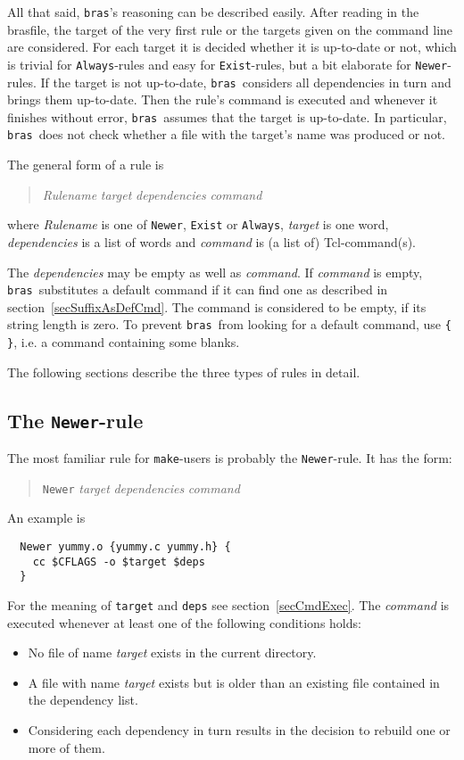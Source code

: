 \documentclass[12pt]{article}
\newcommand{\bras}{\texttt{bras}}
\newcommand{\make}{\texttt{make}}
\begin{document}
All that said, \bras's reasoning can be described easily.  After
reading in the brasfile, the target of the very first rule or the
targets given on the command line are considered. For each target it
is decided whether it is up-to-date or not, which is trivial for
\texttt{Always}-rules and easy for \texttt{Exist}-rules, but a bit
elaborate for \texttt{Newer}-rules. If the target is not up-to-date,
\bras\ considers all dependencies in turn and brings them
up-to-date. Then the rule's command is executed and whenever it
finishes without error, \bras\ assumes that the target is
up-to-date. In particular, \bras\ does not check whether a file with
the target's name was produced or not.

The general form of a rule is
\begin{quote}
\textit{Rulename} \textit{target} \textit{dependencies} \textit{command}
\end{quote}
where \textit{Rulename} is one of \texttt{Newer}, \texttt{Exist} or
\texttt{Always}, \textit{target} is one word, \textit{dependencies} is
a list of words and \textit{command} is (a list of) Tcl-command(s).

The \textit{dependencies} may be empty as well as \textit{command}. If
\textit{command} is empty, \bras\ substitutes a default command if it
can find one as described in section~\ref{secSuffixAsDefCmd}. The
command is considered to be empty, if its string length is zero. To
prevent \bras\ from looking for a default command, use \verb|{ }|,
i.e. a command containing some blanks.

The following sections describe the three types of rules in detail.

\subsection{The \texttt{Newer}-rule}
\label{secNewer}
The most familiar rule for \make-users is probably the
\texttt{Newer}-rule. It has the form:
\begin{quote}
  \texttt{Newer} \textit{target} \textit{dependencies} \textit{command}
\end{quote}
An example is
\begin{verbatim}
  Newer yummy.o {yummy.c yummy.h} {
    cc $CFLAGS -o $target $deps
  }
\end{verbatim}
For the meaning of \texttt{target} and \texttt{deps} see
section~\ref{secCmdExec}. 
The \textit{command} is executed whenever at least one of the
following conditions holds:
\begin{itemize}
\item No file of name \textit{target} exists in the current directory.
\item A file with name \textit{target} exists but is older than an
existing file contained in the dependency list.
\item Considering each dependency in turn results in the decision to
rebuild one or more of them.
\end{itemize}
\end{document}
